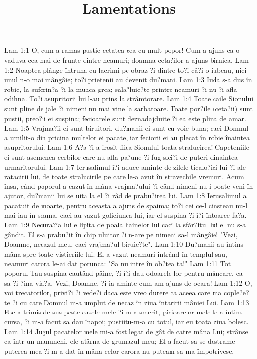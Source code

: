 

\title{Lamentations}

Lam 1:1  O, cum a ramas pustie cetatea cea cu mult popor! Cum a ajuns ca o vaduva cea mai de frunte dintre neamuri; doamna ceta?ilor a ajuns birnica.
Lam 1:2  Noaptea plânge întruna cu lacrimi pe obraz ?i dintre to?i câ?i o iubeau, nici unul n-o mai mângâie; to?i prietenii au devenit du?mani.
Lam 1:3  Iuda s-a dus în robie, la suferin?a ?i la munca grea; sala?luie?te printre neamuri ?i nu-?i afla odihna. To?i asupritorii lui l-au prins la strâmtorare.
Lam 1:4  Toate caile Sionului sunt pline de jale ?i nimeni nu mai vine la sarbatoare. Toate por?ile (ceta?ii) sunt pustii, preo?ii ei suspina; fecioarele sunt deznadajduite ?i ea este plina de amar.
Lam 1:5  Vrajma?ii ei sunt biruitori, du?manii ei sunt cu voie buna; caci Domnul a umilit-o din pricina multelor ei pacate, iar feciorii ei au plecat în robie înaintea asupritorului.
Lam 1:6  A?a ?i-a irosit fiica Sionului toata stralucirea! Capeteniile ei sunt asemenea cerbilor care nu afla pa?une ?i fug slei?i de puteri dinaintea urmaritorului.
Lam 1:7  Ierusalimul î?i aduce aminte de zilele ticalo?iei lui ?i ale ratacirii lui, de toate stralucirile pe care le-a avut în stravechile vremuri. Acum însa, când poporul a cazut în mâna vrajma?ului ?i când nimeni nu-i poate veni în ajutor, du?manii lui se uita la el ?i râd de prabu?irea lui.
Lam 1:8  Ierusalimul a pacatuit de moarte, pentru aceasta a ajuns de spaima; to?i cei ce-l cinsteau nu-l mai iau în seama, caci au vazut goliciunea lui, iar el suspina ?i î?i întoarce fa?a.
Lam 1:9  Necura?ia lui e lipita de poala hainelor lui caci la sfâr?itul lui el nu s-a gândit. El s-a prabu?it în chip uluitor ?i n-are pe nimeni sa-l mângâie! "Vezi, Doamne, necazul meu, caci vrajma?ul biruie?te".
Lam 1:10  Du?manii au întins mâna spre toate vistieriile lui. El a vazut neamuri intrând în templul sau, neamuri carora le-ai dat porunca: "Sa nu intre în ob?tea ta!"
Lam 1:11  Tot poporul Tau suspina cautând pâine, ?i î?i dau odoarele lor pentru mâncare, ca sa-?i ?ina via?a. Vezi, Doamne, ?i ia aminte cum am ajuns de ocara!
Lam 1:12  O, voi trecatorilor, privi?i ?i vede?i daca este vreo durere ca aceea care ma cople?e?te ?i cu care Domnul m-a umplut de necaz în ziua întaririi mâniei Lui.
Lam 1:13  Foc a trimis de sus peste oasele mele ?i m-a smerit, picioarelor mele le-a întins cursa, ?i m-a facut sa dau înapoi; pustiitu-m-a cu totul, iar eu toata ziua bolesc.
Lam 1:14  Jugul pacatelor mele mi-a fost legat de gât de catre mâna Lui; strânse ca într-un manunchi, ele atârna de grumazul meu; El a facut sa se destrame puterea mea ?i m-a dat în mâna celor carora nu puteam sa ma împotrivesc.

